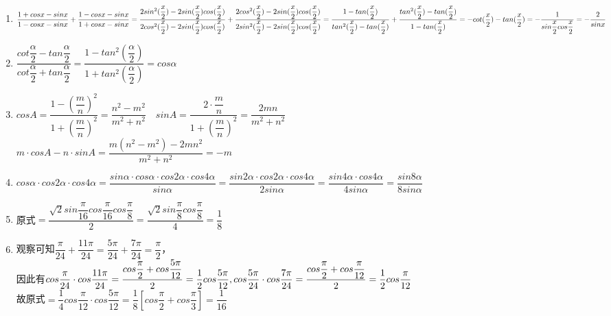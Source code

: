 \begin{enumerate}
\begin{enumerate}
\begin{jieda}
\begin{enumerate}
                \item $\dfrac{1+cosx-sinx}{1-cosx-sinx} + \dfrac{1-cosx-sinx}{1+cosx-sinx} \\
                = \dfrac{2sin^2(\dfrac{x}{2}) - 2sin(\dfrac{x}{2})cos(\dfrac{x}{2})}{2cos^2(\dfrac{x}{2}) - 2sin(\dfrac{x}{2})cos(\dfrac{x}{2})} + \dfrac{2cos^2(\dfrac{x}{2}) - 2sin(\dfrac{x}{2})cos(\dfrac{x}{2})}{2sin^2(\dfrac{x}{2}) - 2sin(\dfrac{x}{2})cos(\dfrac{x}{2})} \\
                = \dfrac{1 - tan(\dfrac{x}{2})}{tan^2(\dfrac{x}{2}) - tan(\dfrac{x}{2})} + \dfrac{tan^2(\dfrac{x}{2}) - tan(\dfrac{x}{2})}{1 - tan(\dfrac{x}{2})} \\
                = -cot(\dfrac{x}{2}) - tan(\dfrac{x}{2}) = -\dfrac{1}{sin\dfrac{x}{2}cos\dfrac{x}{2}} = -\dfrac{2}{sinx}$
                \item $\dfrac{cot\dfrac{\alpha}{2} - tan\dfrac{\alpha}{2}}{cot\dfrac{\alpha}{2} + tan\dfrac{\alpha}{2}} = \dfrac{1 - tan^2(\dfrac{\alpha}{2})}{1+tan^2(\dfrac{\alpha}{2})} = cos\alpha$
                \item $cosA = \dfrac{1-(\dfrac{m}{n})^2}{1+(\dfrac{m}{n})^2} = \dfrac{n^2 - m^2}{m^2+n^2} \quad sinA = \dfrac{2\cdot \dfrac{m}{n}}{1 + (\dfrac{m}{n})^2} = \dfrac{2mn}{m^2+n^2}$ \\
                $m\cdot cosA - n \cdot sinA = \dfrac{m(n^2 - m^2) -2mn^2}{m^2+n^2} = -m$
                \item $cos\alpha \cdot cos2\alpha \cdot cos4\alpha = \dfrac{sin\alpha \cdot cos\alpha \cdot cos2\alpha \cdot cos4\alpha}{sin\alpha} = \dfrac{sin2\alpha \cdot cos2\alpha \cdot cos4\alpha}{2sin\alpha} = \dfrac{sin4\alpha \cdot cos4\alpha}{4sin\alpha} = \dfrac{sin8\alpha}{8sin\alpha}$
                \item 原式$ = \dfrac{\sqrt{2}sin\dfrac{\pi}{16}cos\dfrac{\pi}{16}cos\dfrac{\pi}{8}}{2} = \dfrac{\sqrt{2}sin\dfrac{\pi}{8}cos\dfrac{\pi}{8}}{4} = \dfrac{1}{8}$
                \item 观察可知$\dfrac{\pi}{24} + \dfrac{11\pi}{24} = \dfrac{5\pi}{24} + \dfrac{7\pi}{24} = \dfrac{\pi}{2}$，\\
                因此有$cos\dfrac{\pi}{24} \cdot cos \dfrac{11\pi}{24} = \dfrac{cos\dfrac{\pi}{2} + cos\dfrac{5\pi}{12}}{2} = \dfrac{1}{2}cos\dfrac{5\pi}{12}, \\
                cos\dfrac{5\pi}{24} \cdot cos \dfrac{7\pi}{24} = \dfrac{cos\dfrac{\pi}{2} + cos\dfrac{\pi}{12}}{2} = \dfrac{1}{2}cos\dfrac{\pi}{12}$ \\
                故原式$ = \dfrac{1}{4} cos\dfrac{\pi}{12} \cdot cos\dfrac{5\pi}{12} = \dfrac{1}{8}[cos\dfrac{\pi}{2} + cos\dfrac{\pi}{3}] = \dfrac{1}{16}$

\end{enumerate}
\end{jieda}
\end{enumerate}
\end{enumerate}
